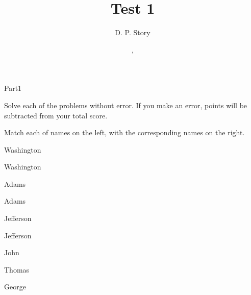 \documentclass{article}
\title[T1]{Test 1}
\author{D. P. Story}
\date{\thisterm, \the\year}
\begin{document}
\maketitle


\begin{exam}{Part1}

\begin{instructions}
Solve each of the problems without error. If you make an error,
points will be subtracted from your total score.
\end{instructions}


\begin{problem*}[\auto]
Match each of names on the left, with the corresponding names on the right.

\begin{multicols}{2}
\begin{parts}
\item\label{dps}\fillin{.5in}{\ref{george}} Washington
\ifkeyalt
\begin{solution}[]
\fillin{.5in}{\ref{george}} Washington
\end{solution}
\fi
\item{}\fillin{.5in}{\ref{john}} Adams
\ifkeyalt
\begin{solution}[]
\fillin{.5in}{\ref{john}} Adams
\end{solution}
\fi
\item{}\fillin{.5in}{\ref{thomas}} Jefferson
\ifkeyalt
\begin{solution}[]
\fillin{.5in}{\ref{thomas}} Jefferson
\end{solution}
\fi

\columnbreak

\renewcommand{\thepartno}{\Alph{partno}}



\label{john} John

\item\label{thomas} Thomas

\item\label{george} George

\end{parts}
\end{multicols}
\end{problem*}

\end{exam}
\end{document}
